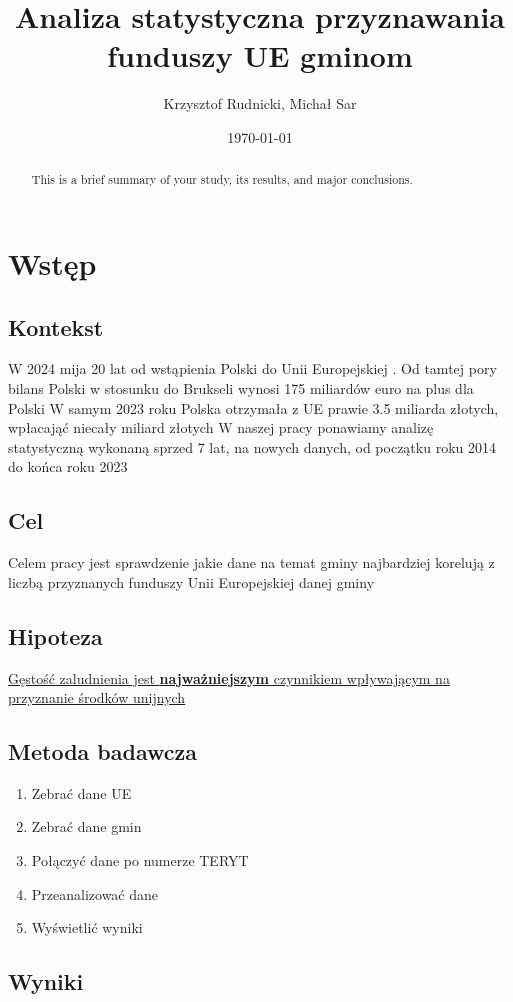 \documentclass[12pt]{article}
\title{Analiza statystyczna przyznawania funduszy UE gminom}
\author{Krzysztof Rudnicki, Michał Sar}
\date{\today}
\begin{document}
\maketitle

\tableofcontents

\begin{abstract}
    This is a brief summary of your study, its results, and major conclusions.
\end{abstract}


\section{Wstęp}
\subsection{Kontekst}
W 2024 mija 20 lat od wstąpienia Polski do Unii Europejskiej \cite{1}. Od tamtej pory bilans Polski w stosunku do Brukseli wynosi 175 miliardów euro na plus dla Polski \cite{2} W samym 2023 roku Polska otrzymała z UE prawie 3.5 miliarda złotych, wpłacająć niecały miliard złotych \cite{3} W naszej pracy ponawiamy analizę statystyczną wykonaną sprzed 7 lat, na nowych danych, od początku roku 2014 do końca roku 2023
\subsection{Cel}
Celem pracy jest sprawdzenie jakie dane na temat gminy najbardziej korelują z liczbą przyznanych funduszy Unii Europejskiej danej gminy
\subsection{Hipoteza} 
\ul{Gęstość zaludnienia jest \textbf{najważniejszym} czynnikiem wpływającym na przyznanie środków unijnych} \\
\subsection{Metoda badawcza}
\begin{enumerate}
    \item Zebrać dane UE
    \item Zebrać dane gmin
    \item Połączyć dane po numerze TERYT
    \item Przeanalizować dane 
    \item Wyświetlić wyniki
\end{enumerate}
\subsection{Wyniki}
\end{document}
